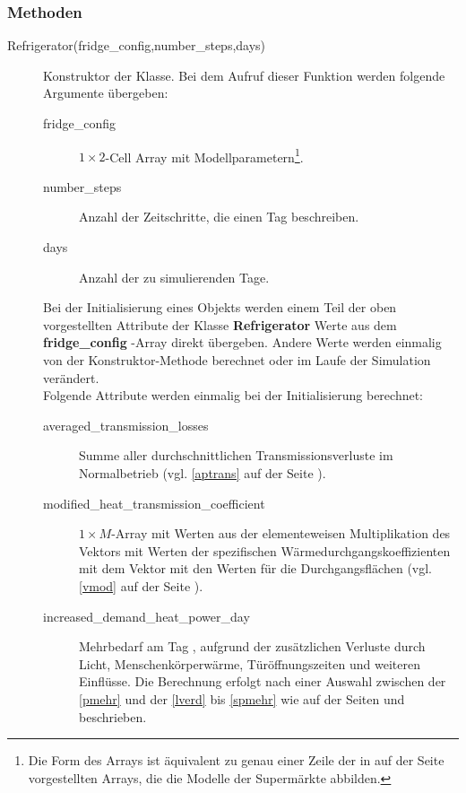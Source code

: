\subsubsection*{Methoden}
\begin{description}
	\item[Refrigerator(fridge\_config,number\_steps,days)] Konstruktor der
	Klasse. Bei dem Aufruf dieser Funktion werden folgende Argumente
	\"ubergeben:
	\begin{description}
		\item[fridge\_config] $1 \times 2$-Cell Array
		mit Modellparametern\footnote{ Die Form des Arrays ist
		\"aquivalent zu genau einer Zeile der in
		 auf der Seite \pageref{csuper} vorgestellten
		Arrays, die die Modelle der Superm\"arkte abbilden.}.
		\item[number\_steps] Anzahl der Zeitschritte, die einen
		Tag beschreiben.
		\item[days] Anzahl der zu simulierenden Tage.
	\end{description}
	Bei der Initialisierung eines Objekts werden einem Teil der oben
	vorgestellten Attribute der Klasse \textbf{Refrigerator} Werte aus dem
	\textbf{ fridge\_config }-Array direkt \"ubergeben. Andere Werte werden
	einmalig von der Konstruktor-Methode berechnet oder im Laufe der
	Simulation ver\"andert.\\

	Folgende Attribute werden einmalig bei der Initialisierung berechnet:
	\begin{description}
		\item[averaged\_transmission\_losses] Summe aller
		durchschnittlichen Transmissionsverluste im Normalbetrieb
		(vgl. \cref{aptrans} auf der Seite \pageref{aptrans}).
		\item[modified\_heat\_transmission\_coefficient] $1\times
		M$-Array mit Werten aus der elementeweisen Multiplikation des
		Vektors mit Werten der spezifischen
		W\"armedurchgangskoeffizienten mit dem Vektor mit den Werten
		f\"ur die Durchgangsfl\"achen (vgl. \cref{vmod} auf der Seite
		\pageref{vmod}).
		\item[increased\_demand\_heat\_power\_day] Mehrbedarf am Tag ,
		aufgrund der zus\"atzlichen Verluste durch Licht,
		Menschenk\"orperw\"arme, T\"ur\"offnungszeiten und weiteren
		Einfl\"usse. Die Berechnung erfolgt nach einer Auswahl
		zwischen der \cref{pmehr} und der \cref{lverd} bis \cref{spmehr}
		wie auf der Seiten \pageref{pmehr} und \pageref{spmehr}
		beschrieben.
	\end{description}


\end{description}
